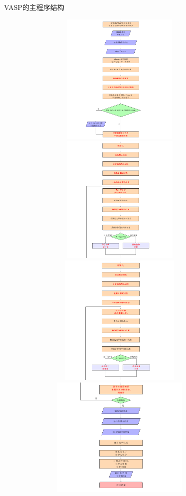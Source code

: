 \begin{frame}[allowframebreaks]{\textrm{VASP}的主程序结构}
\begin{figure}[h!]
\includegraphics[height=2.50in,width=4.0in,viewport=0 0 562 370,clip]{Figures/VASP_main_Flow-2.png}
\includegraphics[height=2.45in,width=4.0in,viewport=0 350 562 660,clip]{Figures/VASP_main_Flow-3.png}
\includegraphics[height=2.50in,width=4.0in,viewport=0 0 562 350,clip]{Figures/VASP_main_Flow-3.png}
\includegraphics[height=2.30in,width=4.0in,viewport=0 215 562 530,clip]{Figures/VASP_main_Flow-4.png}

\end{figure}
\end{frame}
